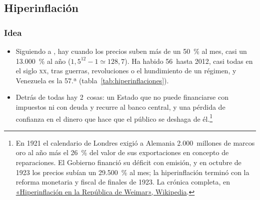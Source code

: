 \documentclass[11pt]{article}
\begin{document}
\subsection{Hiperinflación}\label{sec:hiperinflacion}

\subsubsection{Idea}\label{sec:hiperinflacion-idea}

\begin{itemize}
\item Siguiendo a \textcite{Cagan1956Monetary}, hay  cuando los precios suben más de un 50~\% al mes, casi un 13.000~\% al año ($1{,}5^{12}-1\simeq128{,}7$). Ha habido 56~hasta 2012, casi todas en el siglo \textsc{xx}, tras guerras, revoluciones o el hundimiento de un régimen, y Venezuela es la 57.ª (tabla~\ref{tab:hiperinflaciones})\nocite{HankeKrus2013World,HankeBushnell2017Measuring}.
\item Detrás de todas hay 2~cosas: un Estado que no puede financiarse con impuestos ni con deuda y recurre al banco central, y una pérdida de confianza en el dinero que hace que el público se deshaga de él.\footnote{En 1921 el calendario de Londres exigió a Alemania 2.000~millones de marcos oro al año más el 26~\% del valor de sus exportaciones en concepto de reparaciones\nocite{HansardReparaciones1921}. El Gobierno financió su déficit con emisión, y en octubre de 1923 los precios subían un 29.500~\% al mes\nocite{HankeKrus2013World}; la hiperinflación terminó con la reforma monetaria y fiscal de finales de 1923\nocite{Sargent1982Ends}. La crónica completa, en \href{https://es.wikipedia.org/wiki/Hiperinflaci\%C3\%B3n_en_la_Rep\%C3\%BAblica_de_Weimar}{«Hiperinflación en la República de Weimar», Wikipedia}.}
\end{itemize}
\end{document}
